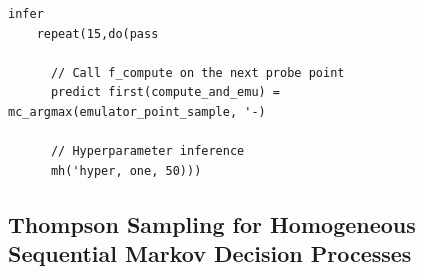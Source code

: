 \documentclass[a0,portrait]{a0poster}
\begin{document}
\begin{multicols}{3}
\begin{minipage}{\linewidth}
\begin{lstlisting}[frame=single,label=alg:structureVent,caption=Venture Code for Bayesian Optimization,mathescape]
infer
    repeat(15,do(pass

      // Call f_compute on the next probe point
      predict first(compute_and_emu) = mc_argmax(emulator_point_sample, '-)
                
      // Hyperparameter inference
      mh('hyper, one, 50)))
\end{lstlisting}
\end{minipage}
      
\subsection*{Thompson Sampling for Homogeneous Sequential Markov Decision Processes}




\end{multicols}
\end{document}
